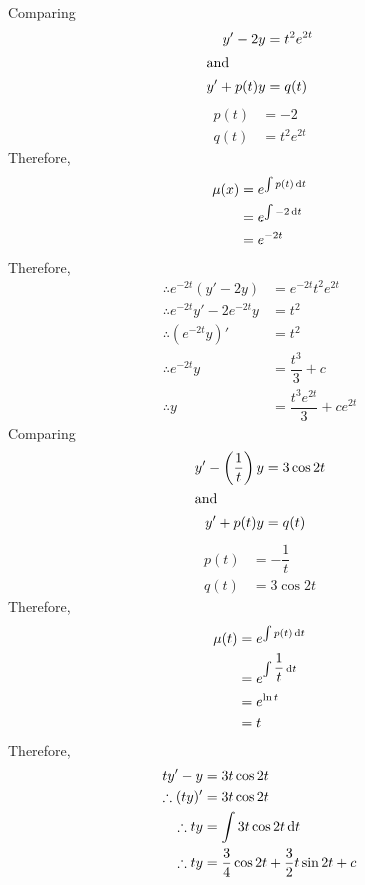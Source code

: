 \documentclass[fleqn, a4paper, 12pt, oneside]{amsart}
\theoremstyle{definition}
\theoremstyle{theorem}
\begin{document}
\begin{solution}
	\begin{tasks}
		\task
			Comparing
			\begin{align*}
				y' - 2y &= t^2 e^{2t}\\
			\intertext{and}
				y' + p(t) y &= q(t)
			\end{align*}
			\begin{align*}
				p(t) &= -2\\
				q(t) &= t^2 e^{2t}
			\end{align*}
			Therefore,
			\begin{align*}
				\mu(x) &= e^{\int p(t) \dif t}\\
				&= e^{\int -2 \dif t}\\
				&= e^{-2 t}
			\end{align*}
			Therefore,
			\begin{align*}
				\therefore e^{-2t} \left( y' - 2y \right) &= e^{-2t} t^2 e^{2t}\\
				\therefore e^{-2t} y' - 2 e^{-2t} y &= t^2\\
				\therefore \left( e^{-2t} y \right)' &= t^2\\
				\therefore e^{-2t} y &= \dfrac{t^3}{3} + c\\
				\therefore y &= \dfrac{t^3 e^{2t}}{3} + c e^{2t}
			\end{align*}
		\task
			Comparing
			\begin{align*}
				y' - \left( \dfrac{1}{t} \right) y &= 3 \cos 2t\\
				\intertext{and}
				y' + p(t) y &= q(t)
			\end{align*}
			\begin{align*}
				p(t) &= -\dfrac{1}{t}\\
				q(t) &= 3 \cos 2t
			\end{align*}
			Therefore,
			\begin{align*}
				\mu(t) &= e^{\int p(t) \dif t}\\
				&= e^{\int \dfrac{1}{t} \dif t}\\
				&= e^{\ln t}\\
				&= t
			\end{align*}
			Therefore,
			\begin{align*}
				t y' - y &= 3 t \cos 2t\\
				\therefore (t y)' &= 3 t \cos 2t\\
				\therefore t y &= \int 3 t \cos 2t \dif t\\
				\therefore t y &= \dfrac{3}{4} \cos 2 t + \dfrac{3}{2} t \sin 2t + c\\

\end{align*}
\end{tasks}
\end{solution}
\end{document}
